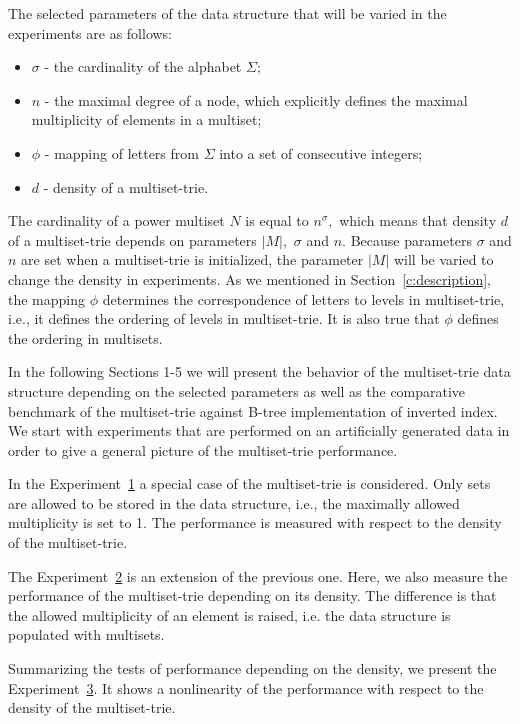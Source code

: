 The selected parameters of the data structure that will be varied in the experiments 
are as follows:
%
\begin{itemize}
\item $\sigma$ - the cardinality of the alphabet $\Sigma;$
%
\item $n$ - the maximal degree of a node, which explicitly defines the maximal 
multiplicity of elements in a multiset;
%
\item $\phi$ - mapping of letters from $\Sigma$ into a set of consecutive 
integers;
%
\item $d$ - density of a multiset-trie.
%
\end{itemize}
The cardinality of a power multiset $N$ is equal to $n^\sigma,$ which means that 
density $d$ of a multiset-trie depends on parameters $|M|,$ $\sigma$ and $n.$ 
Because parameters $\sigma$ and $n$ are set when a multiset-trie is initialized, 
the parameter $|M|$ will be varied to change the density in experiments. As we 
mentioned in Section~\ref{c:description}, the mapping $\phi$ determines the 
correspondence of letters to levels in multiset-trie, i.e., it defines the ordering of 
levels in multiset-trie. It is also true that $\phi$ defines the ordering in multisets.

In the following Sections 1-5 we will present the behavior of the multiset-trie data 
structure depending on the selected parameters as well as the comparative 
benchmark of the multiset-trie against B-tree implementation of inverted index. 
We start with experiments that are performed on an artificially generated data in 
order to give a general picture of the multiset-trie performance. 

In the Experiment~\hyperref[s:exp1]{1} a special case of the multiset-trie is considered. 
Only sets are allowed to be stored in the data structure, i.e., the maximally allowed 
multiplicity is set to 1. The performance is measured with respect to the density 
of the multiset-trie.

The Experiment~\hyperref[s:exp2]{2} is an extension of the previous one. Here, 
we also measure the performance of the multiset-trie depending on its density. 
The difference is that the allowed multiplicity of an element is raised, i.e. 
the data structure is populated with multisets. 

Summarizing the tests of performance depending on the density, we present the 
Experiment~\hyperref[s:exp3]{3}. It shows a nonlinearity of the performance 
with respect to the density of the multiset-trie.

